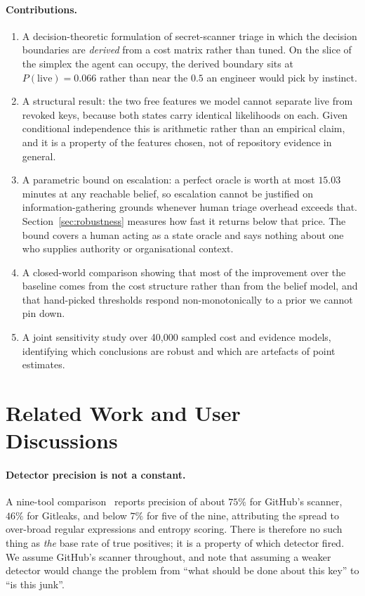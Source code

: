 \documentclass{article}
\begin{document}
\paragraph{Contributions.}
\begin{enumerate}
\item A decision-theoretic formulation of secret-scanner triage in which the
decision boundaries are \emph{derived} from a cost matrix rather than tuned. On
the slice of the simplex the agent can occupy, the derived boundary sits at
$P(\text{live}) = 0.066$ rather than near the $0.5$ an engineer would pick by
instinct.
\item A structural result: the two free features we model cannot separate live
from revoked keys, because both states carry identical likelihoods on each.
Given conditional independence this is arithmetic rather than an empirical
claim, and it is a property of the features chosen, not of repository evidence
in general.
\item A parametric bound on escalation: a perfect oracle is worth at most
$15.03$ minutes at any reachable belief, so escalation cannot be justified on
information-gathering grounds whenever human triage overhead exceeds that.
Section~\ref{sec:robustness} measures how fast it returns below that price. The
bound covers a human acting as a state oracle and says nothing about one who
supplies authority or organisational context.
\item A closed-world comparison showing that most of the improvement over the
baseline comes from the cost structure rather than from the belief model, and
that hand-picked thresholds respond non-monotonically to a prior we cannot pin
down.
\item A joint sensitivity study over 40{,}000 sampled cost and evidence models,
identifying which conclusions are robust and which are artefacts of point
estimates.
\end{enumerate}

\section{Related Work and User Discussions}

\paragraph{Detector precision is not a constant.}
A nine-tool comparison~\cite{basak2023comparative} reports precision of about
$75\%$ for GitHub's scanner, $46\%$ for Gitleaks, and below $7\%$ for five of
the nine, attributing the spread to over-broad regular expressions and entropy
scoring. There is therefore no such thing as \emph{the} base rate of true
positives; it is a property of which detector fired. We assume GitHub's scanner
throughout, and note that assuming a weaker detector would change the problem
from ``what should be done about this key'' to ``is this junk''.
\end{document}
